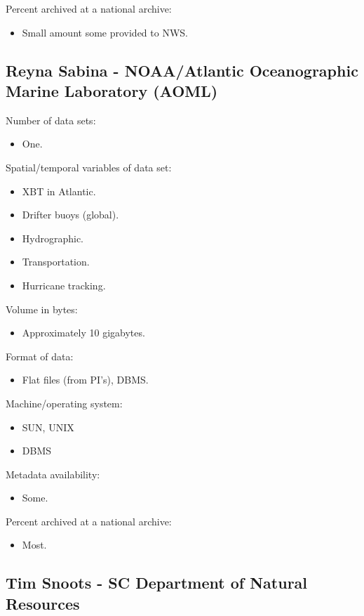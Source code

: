 Percent archived at a national archive:
\begin{itemize}
  \item Small amount some provided to NWS.
\end{itemize}

\subsection{Reyna Sabina - NOAA/Atlantic Oceanographic Marine Laboratory (AOML)}

Number of data sets:
\begin{itemize}
  \item One.
\end{itemize}

Spatial/temporal variables of data set:
\begin{itemize}
  \item XBT in Atlantic.
  \item Drifter buoys (global).
  \item Hydrographic.
  \item Transportation.
  \item Hurricane tracking.
\end{itemize}

Volume in bytes:
\begin{itemize}
  \item Approximately 10 gigabytes.
\end{itemize}

Format of data:
\begin{itemize}
  \item Flat files (from PI's), DBMS.
\end{itemize}

Machine/operating system:
\begin{itemize}
  \item SUN, UNIX
  \item DBMS
\end{itemize}

Metadata availability:
\begin{itemize}
  \item Some.
\end{itemize}

Percent archived at a national archive:
\begin{itemize}
  \item     Most.
\end{itemize}

\subsection{Tim Snoots - SC Department of Natural Resources}

